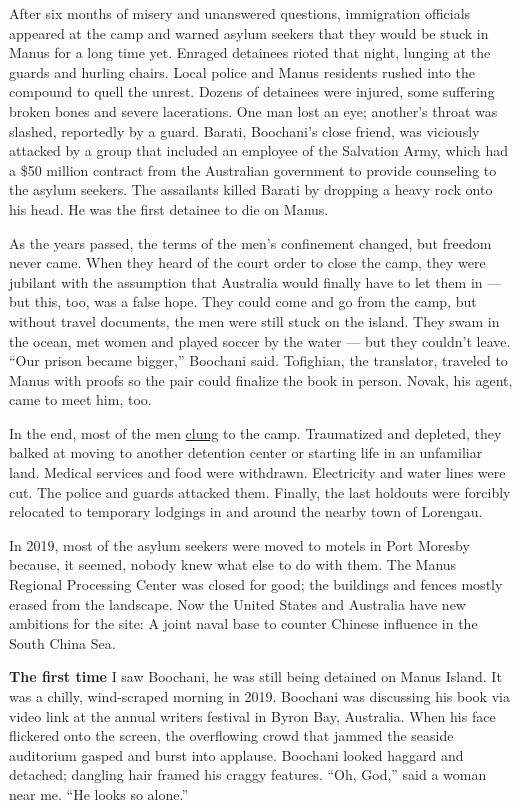 After six months of misery and unanswered questions, immigration
officials appeared at the camp and warned asylum seekers that they would
be stuck in Manus for a long time yet. Enraged detainees rioted that
night, lunging at the guards and hurling chairs. Local police and Manus
residents rushed into the compound to quell the unrest. Dozens of
detainees were injured, some suffering broken bones and severe
lacerations. One man lost an eye; another's throat was slashed,
reportedly by a guard. Barati, Boochani's close friend, was viciously
attacked by a group that included an employee of the Salvation Army,
which had a \$50 million contract from the Australian government to
provide counseling to the asylum seekers. The assailants killed Barati
by dropping a heavy rock onto his head. He was the first detainee to die
on Manus.

As the years passed, the terms of the men's confinement changed, but
freedom never came. When they heard of the court order to close the
camp, they were jubilant with the assumption that Australia would
finally have to let them in --- but this, too, was a false hope. They
could come and go from the camp, but without travel documents, the men
were still stuck on the island. They swam in the ocean, met women and
played soccer by the water --- but they couldn't leave. ``Our prison
became bigger,'' Boochani said. Tofighian, the translator, traveled to
Manus with proofs so the pair could finalize the book in person. Novak,
his agent, came to meet him, too.

In the end, most of the men
\href{https://www.nytimes3xbfgragh.onion/2017/11/02/world/australia/manus-island-refugees.html}{clung}
to the camp. Traumatized and depleted, they balked at moving to another
detention center or starting life in an unfamiliar land. Medical
services and food were withdrawn. Electricity and water lines were cut.
The police and guards attacked them. Finally, the last holdouts were
forcibly relocated to temporary lodgings in and around the nearby town
of Lorengau.

In 2019, most of the asylum seekers were moved to motels in Port Moresby
because, it seemed, nobody knew what else to do with them. The Manus
Regional Processing Center was closed for good; the buildings and fences
mostly erased from the landscape. Now the United States and Australia
have new ambitions for the site: A joint naval base to counter Chinese
influence in the South China Sea.

\textbf{The first time} I saw Boochani, he was still being detained on
Manus Island. It was a chilly, wind-scraped morning in 2019. Boochani
was discussing his book via video link at the annual writers festival in
Byron Bay, Australia. When his face flickered onto the screen, the
overflowing crowd that jammed the seaside auditorium gasped and burst
into applause. Boochani looked haggard and detached; dangling hair
framed his craggy features. ``Oh, God,'' said a woman near me. ``He
looks so alone.''


